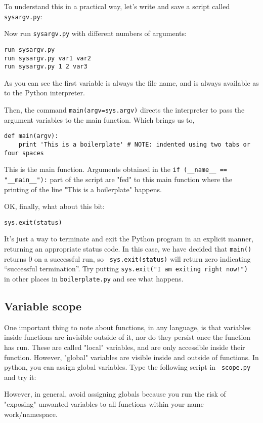 To understand this in a practical way, let's write and save 
a script called {\tt sysargv.py}: 

Now run {\tt sysargv.py} with different numbers of arguments:
\begin{lstlisting}
run sysargv.py
run sysargv.py var1 var2
run sysargv.py 1 2 var3
\end{lstlisting}
As you can see the first variable is always the file name, and is always 
available as to the Python interpreter.

Then, the command {\tt main(argv=sys.argv)} directs the interpreter to 
pass the argument variables to the main function. Which brings us to,
\begin{lstlisting}
def main(argv):
    print 'This is a boilerplate' # NOTE: indented using two tabs or four spaces
\end{lstlisting}
This is the main function. Arguments obtained in the {\tt if 
(\_\_name\_\_ == "\_\_main\_\_"):} part of the script are "fed" to this 
main function where the printing of the line "This is a boilerplate" 
happens.

OK, finally, what about this bit: 
\begin{lstlisting}
sys.exit(status) 
\end{lstlisting}

It's just a way to terminate and exit the Python program in an explicit 
manner, returning an appropriate status code. In this case, we have 
decided that {\tt main()} returns 0 on a successful run, so {\tt 
sys.exit(status)} will return zero indicating ``successful 
termination''. Try putting {\tt sys.exit("I am exiting right now!") } 
in other places in {\tt boilerplate.py} and see what happens.  

\subsection{Variable scope}

One important thing to note about functions, in any language, is that 
variables inside functions are invisible outside of it, nor do they 
persist once the function has run. These are called "local" variables, 
and are only accessible inside their function. However, "global" 
variables are visible inside and outside of functions. In python, you 
can assign global variables. Type the following script in {\tt 
scope.py} and try it:
  


However, in general, avoid assigning globals because you run the risk 
of "exposing" unwanted variables to all functions within your name 
work/namespace. 


